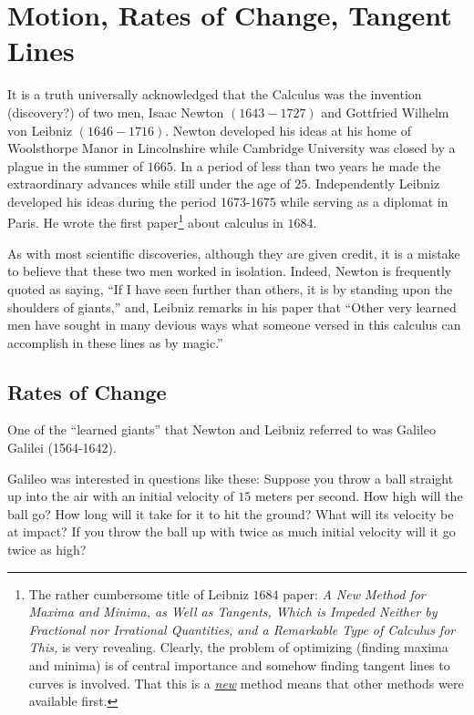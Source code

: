 \chapter{Motion, Rates of Change, Tangent Lines}
  \label{chapt:RatesOfChange}


It is a truth universally acknowledged that the Calculus was the
invention (discovery?) of two men, Isaac Newton $(1643-1727)$ and
Gottfried Wilhelm von Leibniz $(1646-1716).$ Newton developed his
ideas at his home of Woolsthorpe Manor in Lincolnshire while Cambridge
University was closed by a plague in the summer of $1665.$ In a period
of less than two years he made the extraordinary advances while still
under the age of $25.$ Independently Leibniz developed his ideas
during the period 1673-1675 while serving as a diplomat in Paris. He
wrote the first paper\footnote{The rather cumbersome title of Leibniz
  $1684$ paper: \emph{A New Method for Maxima and Minima, as Well as
    Tangents, Which is Impeded Neither by Fractional nor Irrational
    Quantities, and a Remarkable Type of Calculus for This,} is very
  revealing.  Clearly, the problem of optimizing (finding maxima and
  minima) is of central importance and somehow finding tangent lines
  to curves is involved.  That this is a \underline{\emph{new}} method
  means that other methods were available first.} about calculus in
$1684.$


As with most scientific discoveries, although they are given credit,
it is a mistake to believe that these two men worked in isolation.
Indeed, Newton is frequently quoted as saying, ``If I have seen
further than others, it is by standing upon the shoulders of giants,''
and, Leibniz remarks in his paper that ``Other very learned men have
sought in many devious ways what someone versed in this calculus can
accomplish in these lines as by magic.''

\section{Rates of Change}
\label{sec:rates-change}

One of the ``learned giants'' that Newton and Leibniz referred to was
Galileo Galilei (1564-1642).

Galileo was interested in questions like these: Suppose you throw a
ball straight up into the air with an initial velocity of \(15\)
meters per second.  How high will the ball go?  How long will it take
for it to hit the ground?  What will its velocity be at impact?  If
you throw the ball up with twice as much initial velocity will it go
twice as high?

